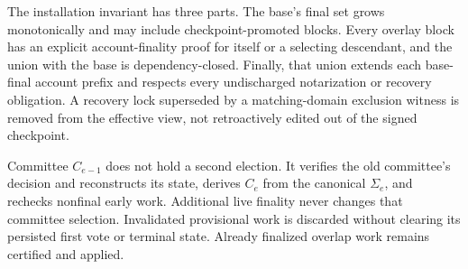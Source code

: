 The installation invariant has three parts. The base's final set grows monotonically and may include checkpoint-promoted blocks. Every overlay block has an explicit account-finality proof for itself or a selecting descendant, and the union with the base is dependency-closed. Finally, that union extends each base-final account prefix and respects every undischarged notarization or recovery obligation. A recovery lock superseded by a matching-domain exclusion witness is removed from the effective view, not retroactively edited out of the signed checkpoint.

Committee $C_{e-1}$ does not hold a second election. It verifies the old committee's decision and reconstructs its state, derives $C_e$ from the canonical $\Sigma_e$, and rechecks nonfinal early work. Additional live finality never changes that committee selection. Invalidated provisional work is discarded without clearing its persisted first vote or terminal state. Already finalized overlap work remains certified and applied.
